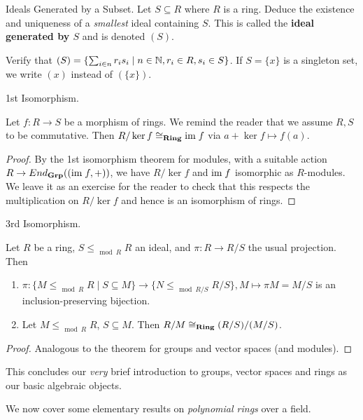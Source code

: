 \documentclass[../book.tex]{subfiles}
\begin{document}
\begin{ex} Ideals Generated by a Subset. 
    Let $S \subseteq R$ where $R$ is a ring. 
    Deduce the existence and uniqueness of a \emph{smallest} ideal containing $S$.
    This is called the \textbf{ideal generated by $S$} and 
    is denoted $(S)$. 
    
    Verify that $(S) = 
    \{ \sum_{i \in n} r_i s_i \mid n \in \mathbb{N}, r_i \in R, s_i \in S\}$. 
    If $S = \{x\}$ is a singleton set, we write $(x)$ instead of $(\{x\})$. 
\end{ex}

\begin{thm} 1st Isomorphism.
    
    Let $f : R \to S$ be a morphism of rings. 
    We remind the reader that we assume $R, S$ to be commutative. 
    Then $R/\ker f \cong_{\mathbf{Ring}} \textnormal{im}\; f$ via $a + \ker f \mapsto f(a)$. 
\end{thm}
\begin{proof}
    By the 1st isomorphism theorem for modules, 
    with a suitable action $R \to End_{\mathbf{Grp}}((\textnormal{im}\; f, +))$,
    we have $R/\ker f$ and $\textnormal{im}\; f$ isomorphic as $R$-modules. 
    We leave it as an exercise for the reader to check that
    this respects the multiplication on $R/\ker f$ and
    hence is an isomorphism of rings.
\end{proof}
\begin{thm} 3rd Isomorphism.

    Let $R$ be a ring, $S \leq_{\mod{R}} R$ an ideal, and
    $\pi : R \to R/S$ the usual projection. 
    Then
    \begin{enumerate}
        \item $\pi : 
        \{M \leq_{\mod{R}} R \mid S \subseteq M\} \to \{N \leq_{\mod{R/S}} R/S\}, 
        M \mapsto \pi M = M/S$ is an inclusion-preserving bijection.
        \item Let $M \leq_{\mod{R}} R$, $S \subseteq M$. 
        Then $R / M \cong_{\mathbf{Ring}} (R / S) / (M / S)$. 
    \end{enumerate}
\end{thm}
\begin{proof}
    Analogous to the theorem for groups and vector spaces (and modules). 
\end{proof}

\begin{rmk}
    This concludes our \emph{very} brief introduction to 
    groups, vector spaces and rings as our basic algebraic objects. 
    
    We now cover some elementary results on \emph{polynomial rings} over a field.
\end{rmk}
\end{document}
